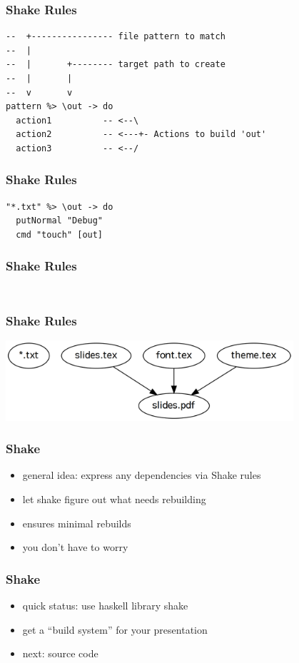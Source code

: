 \documentclass{beamer}
\begin{document}
\begin{frame}[fragile]
  \frametitle{Shake Rules}
  \begin{verbatim}
--  +---------------- file pattern to match
--  |
--  |       +-------- target path to create
--  |       |
--  v       v
pattern %> \out -> do
  action1          -- <--\
  action2          -- <---+- Actions to build 'out'
  action3          -- <--/
  \end{verbatim}
\end{frame}

\begin{frame}[fragile]
  \frametitle{Shake Rules}
  \begin{verbatim}
"*.txt" %> \out -> do
  putNormal "Debug"
  cmd "touch" [out]
  \end{verbatim}
\end{frame}

\begin{frame}[fragile]
  \frametitle{Shake Rules}
  \inputminted[autogobble]{haskell}{snippets/pdf-rule.hs}
  \inputminted[autogobble]{haskell}{snippets/latexmk-rule.hs}
\end{frame}

\begin{frame}
  \frametitle{Shake Rules}
  \begin{center}
    \includegraphics[width=0.8\textwidth]{graphviz/rules.png}
  \end{center}
\end{frame}

\begin{frame}
  \frametitle{Shake}
  \begin{itemize}
  \item general idea: express any dependencies via Shake rules
  \item let shake figure out what needs rebuilding
  \item ensures minimal rebuilds
  \item you don't have to worry
  \end{itemize}
\end{frame}

\begin{frame}
  \frametitle{Shake}
  \begin{itemize}
  \item quick status: use haskell library shake
  \item get a ``build system'' for your presentation
  \item next: source code
  \end{itemize}
\end{frame}
\end{document}
